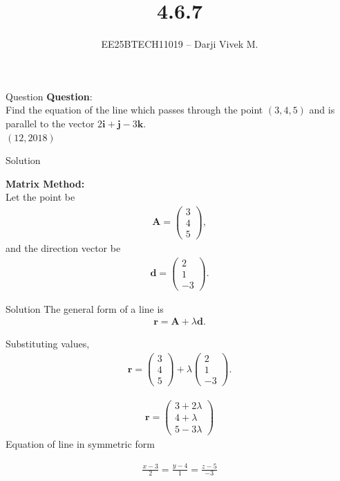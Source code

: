 \documentclass{beamer}
\title{4.6.7}
\author{EE25BTECH11019 -- Darji Vivek M.}
\date{}
\newcommand{\myvec}[1]{\begin{pmatrix}#1\end{pmatrix}}
\newcommand{\brak}[1]{\left( #1 \right)}
\renewcommand{\vec}[1]{\mathbf{#1}}
\begin{document}
\begin{frame}
\titlepage
\end{frame}

\begin{frame}{Question}
\textbf{Question}:\\
Find the equation of the line which passes through the point $(3,4,5)$ and is parallel to the vector $2\vec{i}+\vec{j}-3\vec{k}$.\\[4pt]
\hfill $\brak{12,2018}$
\end{frame}

\begin{frame}{Solution}

\textbf{Matrix Method:}\\
Let the point be
\begin{align}
\vec{A}=\myvec{3\\4\\5},
\end{align}
and the direction vector be
\begin{align}
\vec{d}=\myvec{2\\1\\-3}.
\end{align}
\end{frame}

\begin{frame}{Solution}
The general form of a line is
\begin{align}
\vec{r}=\vec{A}+\lambda\vec{d}.
\end{align}

Substituting values,
\begin{align}
\vec{r}=\myvec{3\\4\\5}+\lambda\myvec{2\\1\\-3}.
\end{align}

\begin{align}
\vec{r}={\myvec{3+2\lambda\\4+\lambda\\5-3\lambda}}
\end{align}
Equation of line in symmetric form

\begin{align}
\frac{x-3}{2}=\frac{y-4}{1}=\frac{z-5}{-3}
\end{align}
\end{frame}
\end{document}
